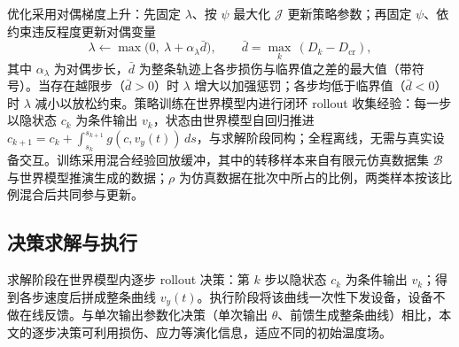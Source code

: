 优化采用对偶梯度上升：先固定 $\lambda$、按 $\psi$ 最大化 $\mathcal{J}$ 更新策略参数；再固定 $\psi$、依约束违反程度更新对偶变量
\begin{equation}
\lambda\leftarrow\max\big(0,\ \lambda+\alpha_{\lambda}\bar{d}\big),\qquad \bar{d}=\max_{k}\,(D_k-D_{\text{cr}}),
\end{equation}
其中 $\alpha_{\lambda}$ 为对偶步长，$\bar{d}$ 为整条轨迹上各步损伤与临界值之差的最大值（带符号）。当存在越限步（$\bar{d}>0$）时 $\lambda$ 增大以加强惩罚；各步均低于临界值（$\bar{d}<0$）时 $\lambda$ 减小以放松约束。策略训练在世界模型内进行闭环 rollout 收集经验：每一步以隐状态 $c_k$ 为条件输出 $v_k$，状态由世界模型自回归推进 $c_{k+1}=c_k+\int_{s_k}^{s_{k+1}}g(c,v_y(t))\,ds$，与求解阶段同构；全程离线，无需与真实设备交互。训练采用混合经验回放缓冲，其中的转移样本来自有限元仿真数据集 $\mathcal{B}$ 与世界模型推演生成的数据；$\rho$ 为仿真数据在批次中所占的比例，两类样本按该比例混合后共同参与更新。

\subsection{决策求解与执行}
求解阶段在世界模型内逐步 rollout 决策：第 $k$ 步以隐状态 $c_k$ 为条件输出 $v_k$；得到各步速度后拼成整条曲线 $v_y(t)$。执行阶段将该曲线一次性下发设备，设备不做在线反馈。与单次输出参数化决策（单次输出 $\theta$、前馈生成整条曲线）相比，本文的逐步决策可利用损伤、应力等演化信息，适应不同的初始温度场。
